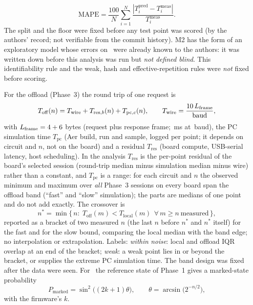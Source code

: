 \begin{equation}\label{eq:mape}\mathrm{MAPE}=\frac{100}{N}\sum_{i=1}^{N}\frac{|T^{\mathrm{pred}}_i-T^{\mathrm{meas}}_i|}{T^{\mathrm{meas}}_i}.\end{equation}
The split and the floor were fixed before any test point was scored (by the authors' record; not verifiable from the commit history). M2 has the form of an exploratory model whose errors on \grover\ were already known to the authors: it was written down before this analysis was run but \emph{not defined blind}. This identifiability rule and the weak, hash and effective-repetition rules were \emph{not} fixed before scoring.

For the offload (Phase~3) the round trip of one request is
\begin{equation}\label{eq:off}T_{\mathrm{off}}(n)=T_{\mathrm{wire}}+T_{\mathrm{res},b}(n)+T_{\mathrm{pc},c}(n),\qquad T_{\mathrm{wire}}=\frac{10\,L_{\mathrm{frame}}}{\mathrm{baud}},\end{equation}
with $L_{\mathrm{frame}}=4+6$ bytes (request plus response frame; \WireMs\,ms at \BaudSp\,baud), the PC simulation time $T_{\mathrm{pc}}$ (Aer build, run and sample, logged per point; it depends on circuit and $n$, not on the board) and a residual $T_{\mathrm{res}}$ (board compute, USB-serial latency, host scheduling). In the analysis $T_{\mathrm{res}}$ is the per-point residual of the board's selected session (round-trip median minus simulation median minus wire) rather than a constant, and $T_{\mathrm{pc}}$ is a range: for each circuit and $n$ the observed minimum and maximum over \emph{all} Phase~3 sessions on every board span the offload band (``fast'' and ``slow'' simulation); the parts are medians of one point and do not add exactly. The crossover is
\begin{equation}\label{eq:cross}n^{*}=\min\{\,n:\;T_{\mathrm{off}}(m)<T_{\mathrm{local}}(m)\ \ \forall\, m\ge n\ \text{measured}\,\},\end{equation}
reported as a bracket of two measured $n$ (the last $n$ before $n^{*}$ and $n^{*}$ itself) for the fast and for the slow bound, comparing the local median with the band edge; no interpolation or extrapolation. Labels: \emph{within noise}: local and offload IQR overlap at an end of the bracket; \emph{weak}: a weak point lies in or beyond the bracket, or supplies the extreme PC simulation time. The band design was fixed after the data were seen. For \grover\ the reference state of Phase~1 gives a marked-state probability
\begin{equation}\label{eq:grover}P_{\mathrm{marked}}=\sin^2\bigl((2k+1)\theta\bigr),\qquad \theta=\arcsin\bigl(2^{-n/2}\bigr),\end{equation}
with the firmware's $k$.

